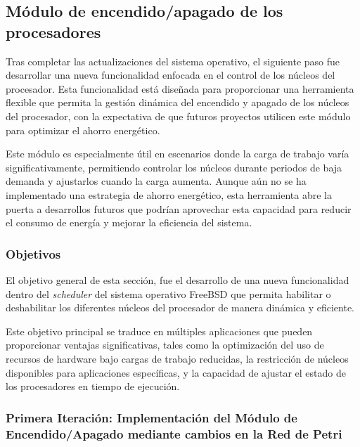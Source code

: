 \subsection{Módulo de encendido/apagado de los procesadores}

Tras completar las actualizaciones del sistema operativo, el siguiente paso fue desarrollar una nueva funcionalidad enfocada en el control de los núcleos del procesador. Esta funcionalidad está diseñada para proporcionar una herramienta flexible que permita la gestión dinámica del encendido y apagado de los núcleos del procesador, con la expectativa de que futuros proyectos utilicen este módulo para optimizar el ahorro energético.

Este módulo es especialmente útil en escenarios donde la carga de trabajo varía significativamente, permitiendo controlar los núcleos durante periodos de baja demanda y ajustarlos cuando la carga aumenta. Aunque aún no se ha implementado una estrategia de ahorro energético, esta herramienta abre la puerta a desarrollos futuros que podrían aprovechar esta capacidad para reducir el consumo de energía y mejorar la eficiencia del sistema.

\subsubsection{Objetivos}

El objetivo general de esta sección, fue el desarrollo de una nueva funcionalidad dentro del \textit{scheduler} del sistema operativo FreeBSD que permita habilitar o deshabilitar los diferentes núcleos del procesador de manera dinámica y eficiente.

Este objetivo principal se traduce en múltiples aplicaciones que pueden proporcionar ventajas significativas, tales como la optimización del uso de recursos de hardware bajo cargas de trabajo reducidas, la restricción de núcleos disponibles para aplicaciones específicas, y la capacidad de ajustar el estado de los procesadores en tiempo de ejecución.

\subsubsection{Primera Iteración: Implementación del Módulo de Encendido/Apagado mediante cambios en la Red de Petri}

